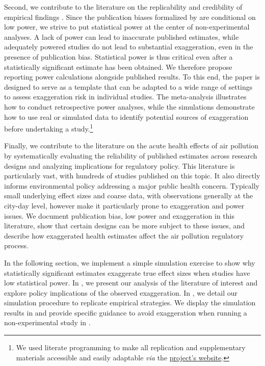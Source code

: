 \documentclass[12pt]{article}
\begin{document}
		 Second, we contribute to the literature on the replicability and credibility of empirical findings \citep{button_power_2013, open_science_collaboration_estimating_2015, christensen_transparency_2018, camerer_evaluating_2016, brodeur_methods_2020, brodeur_mass_2024}. Since the publication biases formalized by \cite{andrews_identification_2019} are conditional on low power, we strive to put statistical power at the center of non-experimental analyses. A lack of power can lead to inaccurate published estimates, while adequately powered studies do not lead to substantial exaggeration, even in the presence of publication bias. Statistical power is thus critical even after a statistically significant estimate has been obtained. We therefore propose reporting power calculations alongside published results. To this end, the paper is designed to serve as a template that can be adapted to a wide range of settings to assess exaggeration risk in individual studies. The meta-analysis illustrates how to conduct retrospective power analyses, while the simulations demonstrate how to use real or simulated data to identify potential sources of exaggeration before undertaking a study.\footnote{We used literate programming to make all replication and supplementary materials accessible and easily adaptable \textit{via} the \href{https://vincentbagilet.github.io/inference_pollution/}{project's website}.}
		 
		 Finally, we contribute to the literature on the acute health effects of air pollution by systematically evaluating the reliability of published estimates across research designs and analyzing implications for regulatory policy. This literature is particularly vast, with hundreds of studies published on this topic. It also directly informs environmental policy addressing a major public health concern. Typically small underlying effect sizes and coarse data, with observations generally at the city-day level, however make it particularly prone to exaggeration and power issues. We document publication bias, low power and exaggeration in this literature, show that certain designs can be more subject to these issues, and describe how exaggerated health estimates affect the air pollution regulatory process.
		 
		 In the following section, we implement a simple simulation exercise to show why statistically significant estimates exaggerate true effect sizes when studies have low statistical power. In , we present our analysis of the literature of interest and explore policy implications of the observed exaggeration. In , we detail our simulation procedure to replicate empirical strategies. We display the simulation results in  and provide specific guidance to avoid exaggeration when running a non-experimental study in .
    
\end{document}

